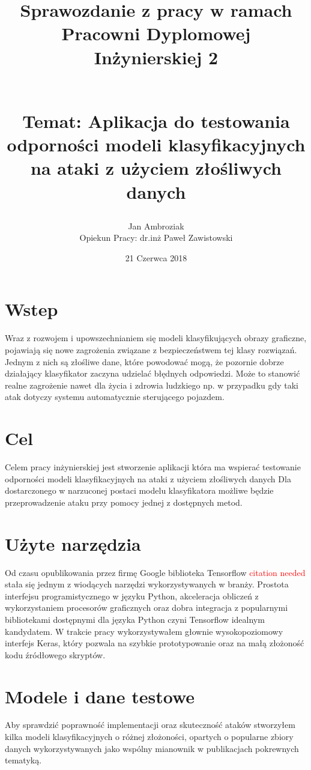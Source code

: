 \documentclass{article}
\title{
Sprawozdanie z pracy w ramach Pracowni Dyplomowej Inżynierskiej 2
\begin{large}
\\Temat: Aplikacja do testowania odporności
modeli klasyfikacyjnych na ataki z użyciem złośliwych danych
\end{large}}
\date{21 Czerwca 2018}
\author{Jan Ambroziak \\ Opiekun Pracy: dr.inż Paweł Zawistowski}
\newcommand\todo[1]{\textcolor{red}{#1}}
\begin{document}
\maketitle

\section{Wstep}
Wraz z rozwojem i upowszechnianiem się modeli klasyfikujących obrazy graficzne,
pojawiają się nowe zagrożenia związane z bezpieczeństwem tej klasy rozwiązań.
Jednym z nich są złośliwe dane, które powodować mogą,
że pozornie dobrze działający klasyfikator zaczyna udzielać błędnych odpowiedzi.
Może to stanowić realne zagrożenie nawet dla życia i zdrowia ludzkiego
np. w przypadku gdy taki atak dotyczy systemu automatycznie sterującego pojazdem.

\section{Cel}
\label{sec:target}
Celem pracy inżynierskiej jest stworzenie aplikacji która ma wspierać testowanie
odporności modeli klasyfikacyjnych na ataki z użyciem złośliwych danych
Dla dostarczonego w narzuconej postaci modelu klasyfikatora możliwe będzie
przeprowadzenie ataku przy pomocy jednej z dostępnych metod.

\section{Użyte narzędzia}
Od czasu opublikowania przez firmę Google biblioteka Tensorflow \todo{citation needed}
stała się jednym z wiodących narzędzi wykorzystywanych w branży. Prostota interfejsu programistycznego
w języku Python, akceleracja obliczeń z wykorzystaniem procesorów graficznych oraz dobra integracja z
popularnymi bibliotekami dostępnymi dla języka Python czyni Tensorflow idealnym kandydatem.
W trakcie pracy wykorzystywałem głownie wysokopoziomowy interfejs Keras, który pozwala na szybkie
prototypowanie oraz na małą złożoność kodu źródłowego skryptów.

\section{Modele i dane testowe}
Aby sprawdzić poprawność implementacji oraz skuteczność ataków stworzyłem
kilka modeli klasyfikacyjnych o różnej złożoności, opartych o popularne zbiory danych
wykorzystywanych jako wspólny mianownik w publikacjach pokrewnych tematyką.
\end{document}
